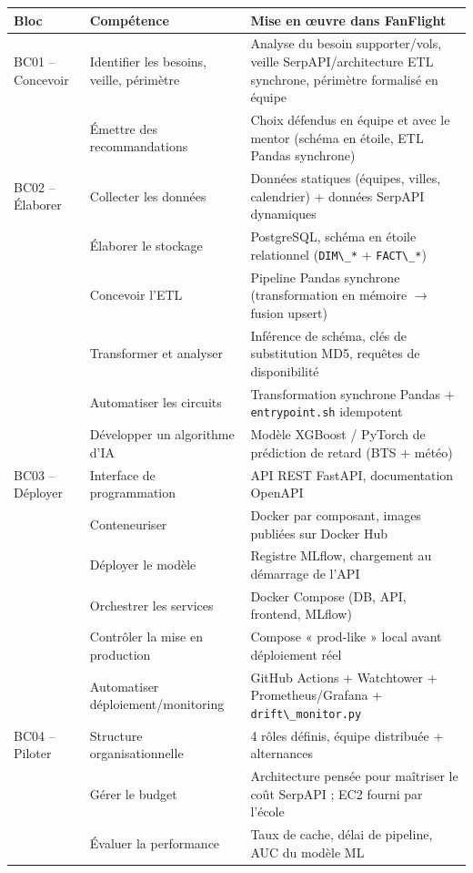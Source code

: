 \documentclass[11pt,a4paper]{report}
\newcommand{\code}[1]{\lstinline{#1}}
\begin{document}
\begin{longtable}{p{2.6cm}p{4.2cm}p{6.8cm}}
\toprule
\textbf{Bloc} & \textbf{Compétence} & \textbf{Mise en œuvre dans FanFlight} \\
\midrule
\endhead
BC01 -- Concevoir & Identifier les besoins, veille, périmètre & Analyse du besoin supporter/vols, veille SerpAPI/architecture ETL synchrone, périmètre formalisé en équipe \\
 & Émettre des recommandations & Choix défendus en équipe et avec le mentor (schéma en étoile, ETL Pandas synchrone) \\
BC02 -- Élaborer & Collecter les données & Données statiques (équipes, villes, calendrier) + données SerpAPI dynamiques \\
 & Élaborer le stockage & PostgreSQL, schéma en étoile relationnel (\code{DIM\_*} + \code{FACT\_*}) \\
 & Concevoir l'ETL & Pipeline Pandas synchrone (transformation en mémoire $\to$ fusion upsert) \\
 & Transformer et analyser & Inférence de schéma, clés de substitution MD5, requêtes de disponibilité \\
 & Automatiser les circuits & Transformation synchrone Pandas + \code{entrypoint.sh} idempotent \\
 & Développer un algorithme d'IA & Modèle XGBoost / PyTorch de prédiction de retard (BTS + météo) \\
BC03 -- Déployer & Interface de programmation & API REST FastAPI, documentation OpenAPI \\
 & Conteneuriser & Docker par composant, images publiées sur Docker Hub \\
 & Déployer le modèle & Registre MLflow, chargement au démarrage de l'API \\
 & Orchestrer les services & Docker Compose (DB, API, frontend, MLflow) \\
 & Contrôler la mise en production & Compose « prod-like » local avant déploiement réel \\
 & Automatiser déploiement/monitoring & GitHub Actions + Watchtower + Prometheus/Grafana + \code{drift\_monitor.py} \\
BC04 -- Piloter & Structure organisationnelle & 4 rôles définis, équipe distribuée + alternances \\
 & Gérer le budget & Architecture pensée pour maîtriser le coût SerpAPI ; EC2 fourni par l'école \\
 & Évaluer la performance & Taux de cache, délai de pipeline, AUC du modèle ML \\
\bottomrule
\end{longtable}
\end{document}
